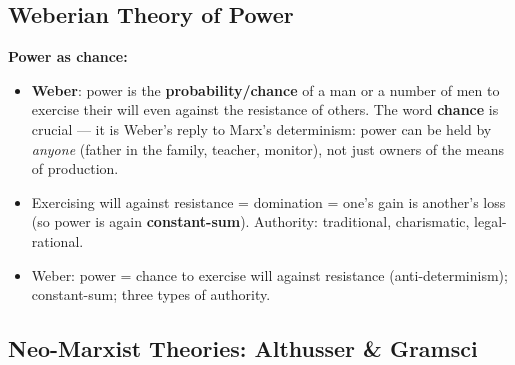 \sectiondivider

\subsection{Weberian Theory of Power}

\begin{KeyConcept}
\textbf{Power as chance:}
\begin{itemize}
\item \textbf{Weber}: power is the \textbf{probability/chance} of a man or a number of men to exercise their will even against the resistance of others. The word \textbf{chance} is crucial --- it is Weber's reply to Marx's determinism: power can be held by \textit{anyone} (father in the family, teacher, monitor), not just owners of the means of production.
\item Exercising will against resistance = domination = one's gain is another's loss (so power is again \textbf{constant-sum}). Authority: traditional, charismatic, legal-rational.
\end{itemize}
\end{KeyConcept}

\begin{QuickRevision}
\begin{itemize}
\item Weber: power = chance to exercise will against resistance (anti-determinism); constant-sum; three types of authority.
\end{itemize}
\end{QuickRevision}

\sectiondivider

\subsection{Neo-Marxist Theories: Althusser \& Gramsci}

